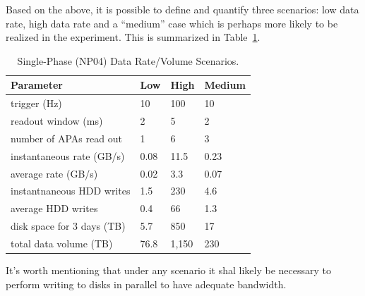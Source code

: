 \documentclass[pdftex,12pt,letter]{article}
\begin{document}
\noindent Based on the above, it is possible to define and quantify three scenarios: low data rate,
high data rate and a ``medium'' case which is perhaps more likely to be realized in the
experiment. This is summarized in Table~\ref{tab:np04_data_rate}.

\begin{table}[tbh]
\centering
\begin{tabular}{l l l l}
\hline
\textbf{Parameter} & \textbf{Low} & \textbf{High} &  \textbf{Medium}\\
\hline
trigger (Hz) & 10 & 100 & 10 \\
readout window (ms) & 2 & 5 & 2 \\
number of APAs read  out & 1 & 6 & 3 \\
\hline\hline
instantaneous rate (GB/s) & 0.08 & 11.5 & 0.23 \\
average rate (GB/s) & 0.02 & 3.3 & 0.07 \\
\hline \hline
instantnaneous  HDD writes & 1.5 & 230 & 4.6 \\
average HDD writes & 0.4 & 66 & 1.3 \\
\hline \hline
disk space for 3 days (TB) & 5.7 & 850 & 17 \\
total data volume (TB) & 76.8 & 1,150 & 230 \\
\hline
\end{tabular}
\caption{\label{tab:np04_data_rate}Single-Phase (NP04) Data Rate/Volume Scenarios.}
\end{table}

\noindent It's worth mentioning that under any scenario it shal likely  be necessary to perform writing to disks in parallel
to have adequate bandwidth.
\end{document}
